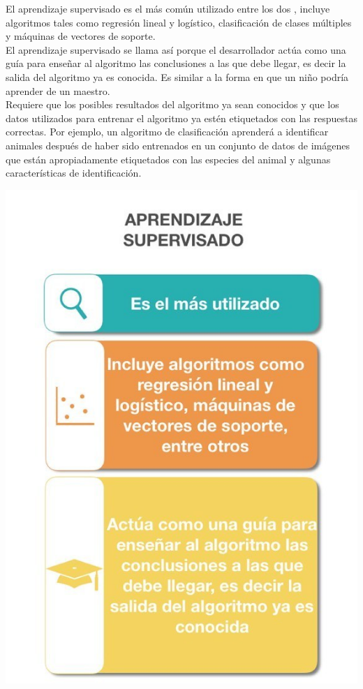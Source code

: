 \documentclass[11pt,a4paper]{article}
\begin{document}
			El aprendizaje supervisado es el más común utilizado entre los dos , incluye algoritmos tales como regresión lineal y logístico, clasificación de clases múltiples y máquinas de vectores de soporte.\\

            El aprendizaje supervisado se llama así porque el desarrollador actúa como una guía para enseñar al algoritmo las conclusiones a las que debe llegar, es decir la salida del algoritmo ya es conocida. Es similar a la forma en que un niño podría aprender de un maestro.\\

            Requiere que los posibles resultados del algoritmo ya sean conocidos y que los datos utilizados para entrenar el algoritmo ya estén etiquetados con las respuestas correctas. Por ejemplo, un algoritmo de clasificación aprenderá a identificar animales después de haber sido entrenados en un conjunto de datos de imágenes que están apropiadamente etiquetados con las especies del animal y algunas características de identificación.\\
            
            \begin{center}
		    \includegraphics[scale=1.0]{./Imagenes/AprendisajeSupervisado}
		    \end{center}
			
\end{document}
